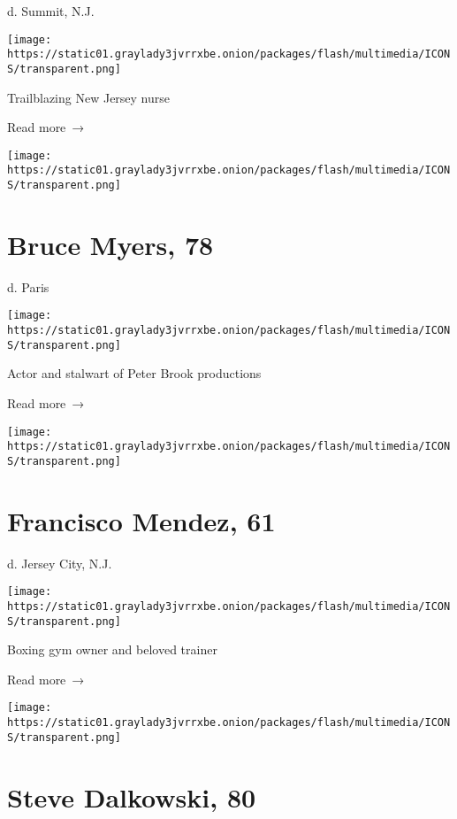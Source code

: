 d. Summit, N.J.

\texttt{[image: https://static01.graylady3jvrrxbe.onion/packages/flash/multimedia/ICONS/transparent.png]}

Trailblazing New Jersey nurse

 Read more~→

\href{https://www.nytimes3xbfgragh.onion/2020/04/27/theater/bruce-myers-dead-coronavirus.html}{}

\texttt{[image: https://static01.graylady3jvrrxbe.onion/packages/flash/multimedia/ICONS/transparent.png]}

\hypertarget{bruce-myers-78}{%
\section{Bruce Myers, 78}\label{bruce-myers-78}}

d. Paris

\texttt{[image: https://static01.graylady3jvrrxbe.onion/packages/flash/multimedia/ICONS/transparent.png]}

Actor and stalwart of Peter Brook productions

 Read more~→

\href{https://www.nytimes3xbfgragh.onion/2020/04/27/nyregion/francisco-mendez-dead-coronavirus.html}{}

\texttt{[image: https://static01.graylady3jvrrxbe.onion/packages/flash/multimedia/ICONS/transparent.png]}

\hypertarget{francisco-mendez-61}{%
\section{Francisco Mendez, 61}\label{francisco-mendez-61}}

d. Jersey City, N.J.

\texttt{[image: https://static01.graylady3jvrrxbe.onion/packages/flash/multimedia/ICONS/transparent.png]}

Boxing gym owner and beloved trainer

 Read more~→

\href{https://www.nytimes3xbfgragh.onion/2020/04/26/obituaries/steve-dalkowski-dead.html}{}

\texttt{[image: https://static01.graylady3jvrrxbe.onion/packages/flash/multimedia/ICONS/transparent.png]}

\hypertarget{steve-dalkowski-80}{%
\section{Steve Dalkowski, 80}\label{steve-dalkowski-80}}

